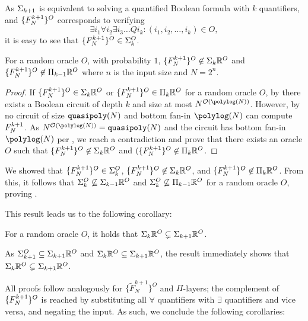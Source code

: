 \documentclass{article}
\begin{document}
As $\Sigma_{k+1}$ is equivalent to solving a quantified Boolean formula with $k$ quantifiers, and $\{ F^{k+1}_N \}^O$ corresponds to verifying \[\exists i_1 \forall i_2 \exists i_3 \dots Q i_k : (i_1, i_2, \dots, i_k) \in O,\] 
it is easy to see that \(\{ F^{k+1}_N \}^O\in \Sigma_{k}^{O}\).

\begin{lemma}
\label{thm:LevelSep}
    For a random oracle $O$, with probability $1$, $\{ F^{k+1}_N \}^O \not\in \Sigma_{k}\mathbb{R}^O$ and $\{ F^{k+1}_N \}^O \not\in \Pi_{k-1}\mathbb{R}^O$ where $n$ is the input size and $N=2^n$.
\end{lemma}
\begin{proof}
    If $\{ F^{k+1}_N \}^O \in \Sigma_{k}\mathbb{R}^O$ or $\{ F^{k+1}_N \}^O \in \Pi_{k}\mathbb{R}^O$ for a random oracle $O$, by 
    there exists a Boolean circuit of depth $k$ and size at most \( N^{\bigO(\polylog(N))} \).
    However, by  no circuit of size $\mathtt{quasipoly}(N)$ and bottom fan-in $\polylog(N)$ can compute $F^{k+1}_N$.
    As \( N^{\bigO(\polylog(N))} = \quasipoly{N}\) and the circuit has bottom fan-in $\polylog(N)$ per , we reach a contradiction and prove that there exists an oracle $O$ such that $\{ F^{k+1}_N \}^O \not\in \Sigma_{k}\mathbb{R}^O$ and $(\{ F^{k+1}_N \}^O \not\in \Pi_{k}\mathbb{R}^O$.
\end{proof}

We showed that $\{ F^{k+1}_N \}^O \in \Sigma_{k}^{O}$, $\{ F^{k+1}_N \}^O \not\in \Sigma_{k}\mathbb{R}^O$, and $\{ F^{k+1}_N \}^O \not\in \Pi_{k}\mathbb{R}^O$.
From this, it follows that $\Sigma_{k}^{O}\not\subseteq\Sigma_{k-1}\mathbb{R}^O$ and $\Sigma_{k}^{O}\not\subseteq\Pi_{k-1}\mathbb{R}^O$ for a random oracle $O$, proving .

This result leads us to the following corollary:
\begin{corollary}
    For a random oracle $O$, it holds that $\Sigma_{k}\mathbb{R}^O \subsetneq \Sigma_{k+1}\mathbb{R}^O$.
\end{corollary}
As $\Sigma_{k+1}^O \subseteq \Sigma_{k+1}\mathbb{R}^O$ and $\Sigma_{k}\mathbb{R}^O \subseteq \Sigma_{k+1}\mathbb{R}^O$, the result immediately shows that $\Sigma_{k}\mathbb{R}^O \subsetneq \Sigma_{k+1}\mathbb{R}^O$.

All proofs follow analogously for $\{ \tilde{F}^{k+1}_N \}^O$ and $\Pi$-layers;
the complement of $\{ F^{k+1}_N \}^O$ is reached by substituting all $\forall$ quantifiers with $\exists$ quantifiers and vice versa, and negating the input.
As such, we conclude the following corollaries:
\end{document}
